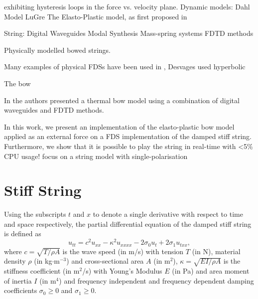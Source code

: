 \documentclass[twoside,a4paper]{article}
\begin{document}
exhibiting hysteresis loops in the force vs. velocity plane.  
Dynamic models:
Dahl Model
LuGre 
The Elasto-Plastic model, as first proposed in
\cite{Dupont2002}

String:
Digital Waveguides
Modal Synthesis
Mass-spring systems
FDTD methods

Physically modelled bowed strings.

Many examples of physical
FDSs have been used in \cite{Desvages2017}, Desvages used hyperbolic

The bow 

In \cite{Maestre2014} the authors presented a thermal bow model using a combination of digital waveguides and FDTD methods.

In this work, we present an implementation of the elasto-plastic bow model applied as an external force on a FDS implementation of the damped stiff string. Furthermore, we show that it is possible to play the string in real-time with <5\% CPU usage! 
focus on a string model with single-polarisation

\section{Stiff String}
Using the subscripts $t$ and $x$ to denote a single derivative with respect to time and space respectively, the partial differential equation of the damped stiff string is defined as \cite{Bilbao2009}
\begin{equation}\label{eq:PDE}
    u_{tt} = c^2u_{xx}-\kappa^2u_{xxxx}-2\sigma_0u_t+2\sigma_1u_{txx},
\end{equation}
where $c = \sqrt{T/\rho A}$ is the wave speed (in m/s) with tension $T$ (in N), material density $\rho$ (in kg$\cdot$m$^{-3}$) and cross-sectional area $A$ (in m$^2$), $\kappa = \sqrt{EI/\rho A}$ is the stiffness coefficient (in m$^2$/s) with Young's Modulus $E$ (in Pa) and area moment of inertia $I$ (in m$^4$) and frequency independent and frequency dependent damping coefficients $\sigma_0 \geq 0$ and $\sigma_1 \geq 0$.
\end{document}
